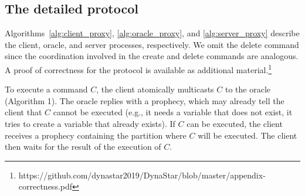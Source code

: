 \subsection{The detailed protocol}
\label{sec:detailed}

Algorithms~\ref{alg:client_proxy}, \ref{alg:oracle_proxy}, and \ref{alg:server_proxy} describe the client, oracle, and server processes, respectively. 
We omit the delete command since the coordination involved in the create and delete commands are analogous. 
A proof of correctness for the protocol is available as additional material.\footnote{https://github.com/dynastar2019/DynaStar/blob/master/appendix-correctness.pdf}



To execute a command $C$, the client atomically multicasts $C$ to the oracle (Algorithm 1).
The oracle replies with a prophecy, which may already tell the client that $C$ cannot be executed (e.g., it needs a variable that does not exist, it tries to create a variable that already exists).
If $C$ can be executed, the client receives a prophecy containing the partition where $C$ will be executed. The client then waits for the result of the execution of $C$.





